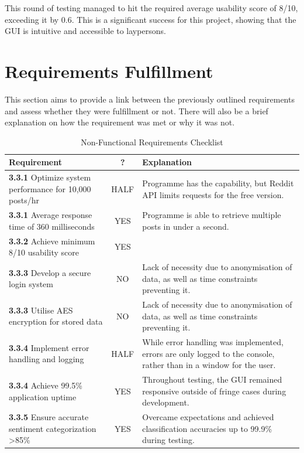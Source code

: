         This round of testing managed to hit the required average usability score of 8/10, exceeding it by 0.6. This is a significant success for this project, showing that the GUI is intuitive and accessible to laypersons.

\section{Requirements Fulfillment}
This section aims to provide a link between the previously outlined requirements and assess whether they were fulfillment or not. There will also be a brief explanation on how the requirement was met or why it was not.

\begin{table}[h]
    \centering
    \caption{Non-Functional Requirements Checklist}
    \label{tab:non_functional_requirements}
    \begin{tabular}{p{6cm}|c|p{6cm}}
        \textbf{Requirement} & \textbf{?} & \textbf{Explanation} \\ \hline\hline
        \textbf{3.3.1} Optimize system performance for 10,000 posts/hr & HALF & Programme has the capability, but Reddit API limits requests for the free version. \\ \hline
        \textbf{3.3.1} Average response time of 360 milliseconds & YES & Programme is able to retrieve multiple posts in under a second. \\ \hline
        \textbf{3.3.2} Achieve minimum 8/10 usability score & YES &  \\ \hline
        \textbf{3.3.3} Develop a secure login system & NO & Lack of necessity due to anonymisation of data, as well as time constraints preventing it. \\ \hline
        \textbf{3.3.3} Utilise AES encryption for stored data & NO & Lack of necessity due to anonymisation of data, as well as time constraints preventing it. \\ \hline
        \textbf{3.3.4} Implement error handling and logging & HALF & While error handling was implemented, errors are only logged to the console, rather than in a window for the user. \\ \hline
        \textbf{3.3.4} Achieve 99.5\% application uptime & YES & Throughout testing, the GUI remained responsive outside of fringe cases during development. \\ \hline
        \textbf{3.3.5} Ensure accurate sentiment categorization >85\% & YES & Overcame expectations and achieved classification accuracies up to 99.9\% during testing. \\ 
    \end{tabular}
\end{table}

